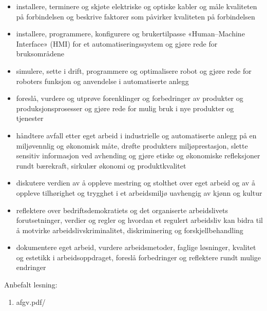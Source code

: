 \begin{itemize}[noitemsep]
	\item installere, terminere og skjøte elektriske og optiske kabler og måle kvaliteten på forbindelsen og beskrive faktorer som påvirker kvaliteten på forbindelsen
	\item installere, programmere, konfigurere og brukertilpasse «Human–Machine Interface» (HMI) for et automatiseringssystem og gjøre rede for bruksområdene
	\item simulere, sette i drift, programmere og optimalisere robot og gjøre rede for roboters funksjon og anvendelse i automatiserte anlegg
	\item foreslå, vurdere og utprøve forenklinger og forbedringer av produkter og produksjonsprosesser og gjøre rede for mulig bruk i nye produkter og tjenester
	\item håndtere avfall etter eget arbeid i industrielle og automatiserte anlegg på en miljøvennlig og økonomisk måte, drøfte produkters miljøprestasjon, slette sensitiv informasjon ved avhending og gjøre etiske og økonomiske refleksjoner rundt bærekraft, sirkulær økonomi og produktkvalitet
	\item diskutere verdien av å oppleve mestring og stolthet over eget arbeid og av å oppleve tilhørighet og trygghet i et arbeidsmiljø uavhengig av kjønn og kultur
	\item reflektere over bedriftsdemokratiets og det organiserte arbeidslivets forutsetninger, verdier og regler og hvordan et regulert arbeidsliv kan bidra til å motvirke arbeidslivskriminalitet, diskriminering og forskjellbehandling
	\item dokumentere eget arbeid, vurdere arbeidsmetoder, faglige løsninger, kvalitet og estetikk i arbeidsoppdraget, foreslå forbedringer og reflektere rundt mulige endringer




\end{itemize}

Anbefalt lesning:

\begin{enumerate}
	\item afgv.pdf/ 
\end{enumerate}



